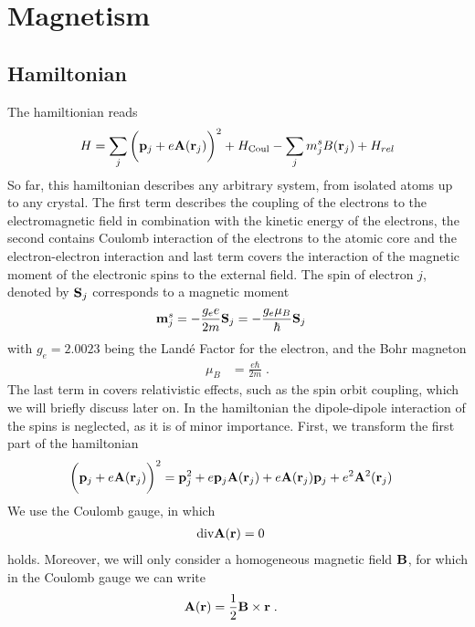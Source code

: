 
\chapter{Magnetism}

\section{Hamiltonian}

The hamiltionian reads
%
\begin{align}\label{eq:H:a}
H = \sum_{j}\bigg( \mathbf p_{j} + e \mathbf A(\mathbf r_{j}) \bigg)^{2} 
+ H_\text{Coul}- \sum_{j}  m^{s}_{j}B(\mathbf r_{j}) +H_{rel}
\end{align}
%
So far, this  hamiltonian describes any arbitrary system, from isolated atoms up to any crystal.
The first term describes the coupling of the electrons to the electromagnetic field in combination with  the kinetic energy of the electrons, the second contains Coulomb interaction of the electrons to the atomic core and the electron-electron interaction and last term covers the interaction of the magnetic moment of the electronic spins 
to the external field. The spin of electron $j$, denoted by $\mathbf S_{j}$ corresponds to a magnetic moment
%
\begin{align}\label{eq:magmo:spin}
\mathbf m_{j}^{s} &= - \frac{g_{e} e}{2m } \mathbf S_{j} 
= -\frac{g_{e} \mu_{B}}{\hbar  } \mathbf S_{j} 
\end{align}
%
with $g_{e}=2.0023$ being the Land\'e Factor for the electron,
and the Bohr magneton
%
\begin{align}
\mu_{B} &= \frac{e \hbar}{2m}\;.
\end{align}
%
The last term in  covers relativistic effects, such as the spin orbit coupling, which we will briefly discuss later on.
In the hamiltonian the dipole-dipole interaction of the spins is neglected, as it is of minor importance.
First, we transform  the first part of the hamiltonian 
%
\begin{align*}
\bigg( \mathbf p_{j} + e \mathbf A(\mathbf r_{j}) \bigg)^{2} &= \mathbf p_{j}^{2} +e  \mathbf p_{j}  \mathbf A(\mathbf r_{j})
+e  \mathbf A (\mathbf r_{j}) \mathbf p_{j}  + e^{2}\mathbf A^{2}( \mathbf r_{j})
\end{align*}
%
We use the Coulomb gauge, in which
%
\begin{align*}
\text{div} \mathbf A(\mathbf r) &= 0
\end{align*}
%
holds. Moreover, we will only consider a homogeneous magnetic field
$\mathbf B$, for which in the Coulomb gauge we can write
%
\begin{align*}
\mathbf A(\mathbf r) &= \frac{1}{2}\mathbf B\times \mathbf r\;.
\end{align*}
